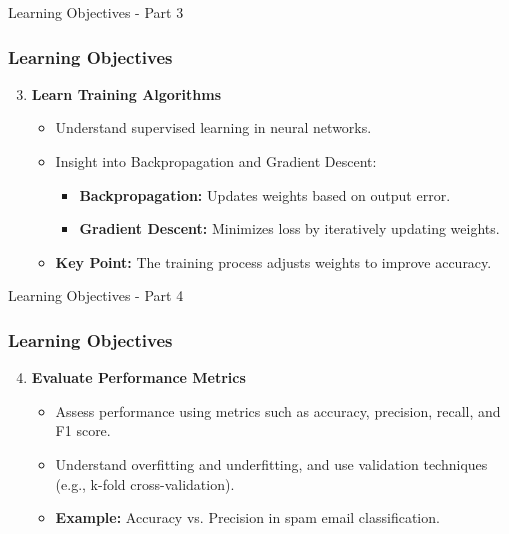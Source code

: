 \documentclass[aspectratio=169]{beamer}
\begin{document}
\begin{frame}[fragile]{Learning Objectives - Part 3}
    \frametitle{Learning Objectives}
    \begin{enumerate}
        \setcounter{enumi}{2}
        \item \textbf{Learn Training Algorithms}
            \begin{itemize}
                \item Understand supervised learning in neural networks.
                \item Insight into Backpropagation and Gradient Descent:
                    \begin{itemize}
                        \item \textbf{Backpropagation:} Updates weights based on output error.
                        \item \textbf{Gradient Descent:} Minimizes loss by iteratively updating weights.
                    \end{itemize}
                \item \textbf{Key Point:} The training process adjusts weights to improve accuracy.
            \end{itemize}
    \end{enumerate}
\end{frame}

\begin{frame}[fragile]{Learning Objectives - Part 4}
    \frametitle{Learning Objectives}
    \begin{enumerate}
        \setcounter{enumi}{3}
        \item \textbf{Evaluate Performance Metrics}
            \begin{itemize}
                \item Assess performance using metrics such as accuracy, precision, recall, and F1 score.
                \item Understand overfitting and underfitting, and use validation techniques (e.g., k-fold cross-validation).
                \item \textbf{Example:} Accuracy vs. Precision in spam email classification.
            \end{itemize}
    \end{enumerate}
\end{frame}
\end{document}
